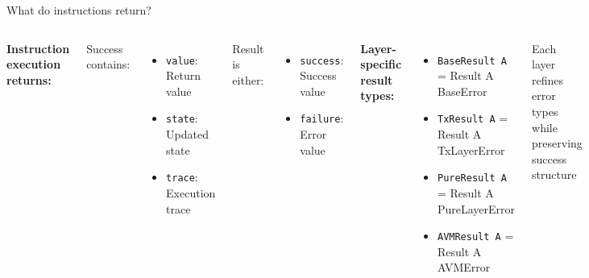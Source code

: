 \documentclass[handout,aspectratio=169,xcolor=dvipsnames,10pt]{beamer}
\begin{document}
\begin{frame}{What do instructions return?}

\begin{columns}[T]

\textbf{Instruction execution returns:}

\vspace{0.3em}

Success contains:
\begin{itemize}\scriptsize
  \item \texttt{value}: Return value
  \item \texttt{state}: Updated state
  \item \texttt{trace}: Execution trace
\end{itemize}

\vspace{0.3em}

Result is either:
\begin{itemize}\scriptsize
  \item \texttt{success}: Success value
  \item \texttt{failure}: Error value
\end{itemize}


\textbf{Layer-specific result types:}

\vspace{0.3em}

\begin{itemize}\scriptsize
  \item \texttt{BaseResult A} = Result A BaseError
  \item \texttt{TxResult A} = Result A TxLayerError
  \item \texttt{PureResult A} = Result A PureLayerError
  \item \texttt{AVMResult A} = Result A AVMError
\end{itemize}

\vspace{0.5em}

{\small Each layer refines error types while preserving success structure}

\end{columns}

\end{frame}

\end{document}
